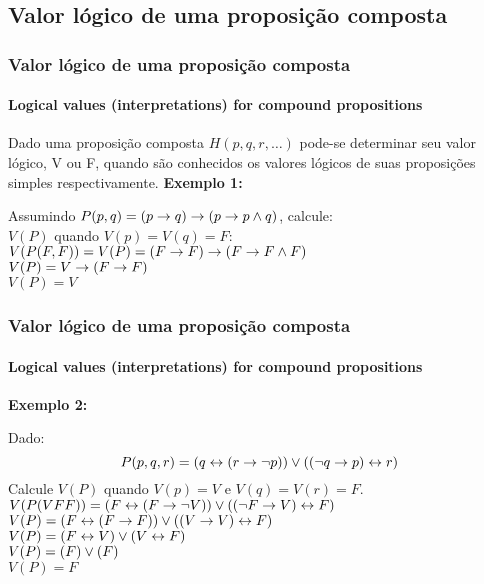 \subsection{Valor lógico de uma proposição composta}
%
\begin{frame}[t]
    \frametitle{Valor lógico de uma proposição composta}
    \framesubtitle{Logical values (interpretations) for compound propositions}
    \begin{tcolorbox}[colback=red!5!white,colframe=red!75!black,title=Definição]
        \indent Dado uma proposição composta $H(p,q, r, \dots)$ pode-se determinar seu valor lógico, V ou F, quando são conhecidos os valores lógicos de suas proposições simples respectivamente.
        \tcblower
        \textbf{Exemplo 1:}
        \begin{tcolorbox}
            Assumindo $P(p,q) = (p \rightarrow q) \rightarrow (p \rightarrow p\land q)$, calcule: \\
            $V(P)$ quando $V(p)=V(q)=F$: \\ [4pt]
            $V(P(F,F))=V(P)=(F \rightarrow F) \rightarrow (F \rightarrow F\land F)$ \\
            $V(P)=V \rightarrow (F \rightarrow F)$ \\
            $V(P) = V$
        \end{tcolorbox}
    \end{tcolorbox}
\end{frame}
%
\begin{frame}[t]
    \frametitle{Valor lógico de uma proposição composta}
    \framesubtitle{Logical values (interpretations) for compound propositions}
    \begin{tcolorbox}[colback=red!5!white,colframe=red!75!black,title=Definição]
        \textbf{Exemplo 2:}
        \begin{tcolorbox}
            Dado:
            $$P(p,q,r) = (q \leftrightarrow (r \rightarrow \lnot p)) \lor ((\lnot q \rightarrow p) \leftrightarrow r)$$
            Calcule $V(P)$ quando $V(p)=V$ e $V(q)=V(r)=F$. \\ [4pt]
            $V(P(VFF)) = (F \leftrightarrow (F \rightarrow \lnot V)) \lor ((\lnot F \rightarrow V) \leftrightarrow F)$ \\
            $V(P) = (F \leftrightarrow (F \rightarrow F)) \lor ((V \rightarrow V) \leftrightarrow F)$ \\
            $V(P) = (F \leftrightarrow V) \lor (V \leftrightarrow F)$ \\
            $V(P) = (F) \lor (F)$ \\
            $V(P) = F$
        \end{tcolorbox}
    \end{tcolorbox}
\end{frame}
%
